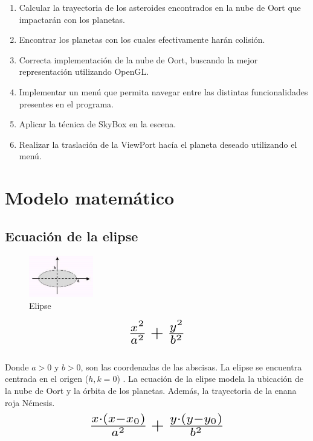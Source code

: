 \documentclass[journal]{IEEEtran}
\begin{document}
\begin{enumerate}
	\item Calcular la trayectoria de los asteroides encontrados en la nube de Oort que impactarán con los planetas.
	\item Encontrar los planetas con los cuales efectivamente harán colisión.
	\item Correcta implementación de la nube de Oort, buscando la mejor representación utilizando OpenGL.
	\item Implementar un menú que permita navegar entre las distintas funcionalidades presentes en el programa.
	\item Aplicar la técnica de SkyBox en la escena.
	\item Realizar la traslación de la ViewPort hacía el planeta deseado utilizando el menú.
\end{enumerate}

\section{Modelo matemático}

\subsection{Ecuación de la elipse}

\begin{figure}[h!]
	\includegraphics[width=0.25\textwidth, height=0.25\textwidth]{elipse.png}
	\centering
	\caption{Elipse}
\end{figure}

\newpage

\[ \scalebox{2}{$\frac{x^{2}}{a^{2}} + \frac{y^{2}}{b^{2}}$} \]\\

Donde $a>0$ y $b>0$, son las coordenadas de las abscisas. La elipse se encuentra centrada en el origen ($h,k=0$) \cite{enciclopedia}. La ecuación de la elipse modela la ubicación de la nube de Oort y la órbita de los planetas. Además, la trayectoria de la enana roja Némesis.\\

\[ \scalebox{2}{$ \frac{x\cdot(x-x_{0})}{a^{2}} + \frac{y\cdot(y-y_{0})}{b^{2}}$} \]\\
\end{document}
